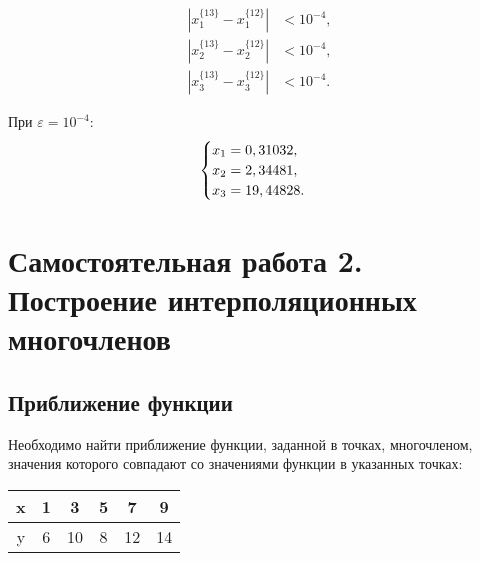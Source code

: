 \documentclass[10pt, a4paper, titlepage]{article}
\begin{document}
\begin{align*}
    \left|x_1^{\{13\}}-x_1^{\{12\}}\right| &< 10^{-4}, \\
    \left|x_2^{\{13\}}-x_2^{\{12\}}\right| &< 10^{-4}, \\
    \left|x_3^{\{13\}}-x_3^{\{12\}}\right| &< 10^{-4}.
\end{align*}

При $\varepsilon=10^{-4}$:
\begin{equation*}
    \begin{cases}
        $$x_1=0,31032$$, \\
        $$x_2=2,34481$$, \\
        $$x_3=19,44828$$.
    \end{cases}
\end{equation*}

\newpage
\section{Самостоятельная работа \textnumero{} 2. Построение интерполяционных многочленов}

\subsection*{Приближение функции}

Необходимо найти приближение функции, заданной в точках, многочленом, значения которого совпадают со значениями функции в указанных точках:

\begin{center}
    \begin{tabular}{|*{6}{C|}}
         \hline
         x & 1 & 3 & 5 & 7 & 9 \\ \hline
         y & 6 & 10 & 8 & 12 & 14 \\
         \hline
    \end{tabular}
\end{center}
\end{document}
